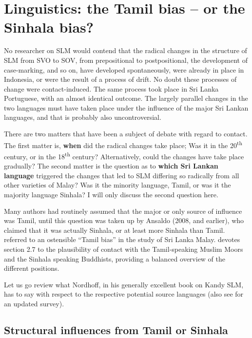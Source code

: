 \section{Linguistics: the Tamil bias -- or the Sinhala bias?}\label{bakker:sec:4}
No researcher on SLM would contend that the radical changes in the structure of SLM from SVO to SOV, from prepositional to postpositional, the development of case-marking, and so on, have developed spontaneously,  were  already in place in Indonesia, or were the result of a  process of drift. No doubt these processes of change were contact-induced. The same process took place in Sri Lanka Portuguese, with an almost identical outcome. The largely parallel changes in the two languages \citep[cf.][]{Bakker2006} must have taken place under the influence of the major Sri Lankan languages, and that is probably also uncontroversial. 

There are two matters that have been a subject of debate with regard to  contact. The first matter is, \textbf{when} did the radical changes take place; Was it in the 20\textsuperscript{th} century, or in the 18\textsuperscript{th} century? 
Alternatively, could the changes have take place gradually? The second matter is the question as to \textbf{which Sri Lankan language} triggered the changes that led to SLM differing  so radically from all other varieties of Malay? Was it the minority language, Tamil, or was it the majority language Sinhala? I will only discuss the second question here.

Many authors had routinely assumed that the major or only source of influence was Tamil, until this question was taken up by Ansaldo (2008, and earlier), who claimed that it was actually Sinhala, or at least more Sinhala than Tamil. \citet{Ansaldo2005ms,Ansaldo2008genesis} referred to an ostensible ``Tamil bias'' in the study of Sri Lanka Malay. \citet{Nordhoff2009} devotes section 2.7 to the plausibility of contact with the Tamil-speaking Muslim Moors and the Sinhala speaking Buddhists, providing a balanced overview of the different positions. 

Let us go review what Nordhoff, in his generally excellent book on Kandy SLM, has to say with respect to the respective potential source languages (also see \citet{Nordhoff2008msdiachronica} for an updated survey).

\subsection{Structural influences from Tamil or Sinhala}%
